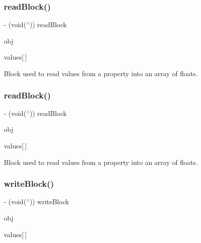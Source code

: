 \subsubsection{\texorpdfstring{read\+Block()}{readBlock()}\hspace{0.1cm}{\footnotesize\ttfamily [1/2]}}
{\footnotesize\ttfamily -\/ (void($^\wedge$)) read\+Block \begin{DoxyParamCaption}\item[{(id)}]{obj }\item[{(C\+G\+Float)}]{values\mbox{[}$\,$\mbox{]} }\end{DoxyParamCaption}}

Block used to read values from a property into an array of floats. \mbox{\label{interface_p_o_p_animatable_property_a1b4363504a04cc556a6c80de5d4d7641}} 
\subsubsection{\texorpdfstring{read\+Block()}{readBlock()}\hspace{0.1cm}{\footnotesize\ttfamily [2/2]}}
{\footnotesize\ttfamily -\/ (void($^\wedge$)) read\+Block \begin{DoxyParamCaption}\item[{(id)}]{obj }\item[{(C\+G\+Float)}]{values\mbox{[}$\,$\mbox{]} }\end{DoxyParamCaption}}

Block used to read values from a property into an array of floats. \mbox{\label{interface_p_o_p_animatable_property_a99ca8be7da49f05f0ee230a5bbc53df9}} 
\subsubsection{\texorpdfstring{write\+Block()}{writeBlock()}\hspace{0.1cm}{\footnotesize\ttfamily [1/2]}}
{\footnotesize\ttfamily -\/ (void($^\wedge$)) write\+Block \begin{DoxyParamCaption}\item[{(id)}]{obj }\item[{(const C\+G\+Float)}]{values\mbox{[}$\,$\mbox{]} }\end{DoxyParamCaption}}

